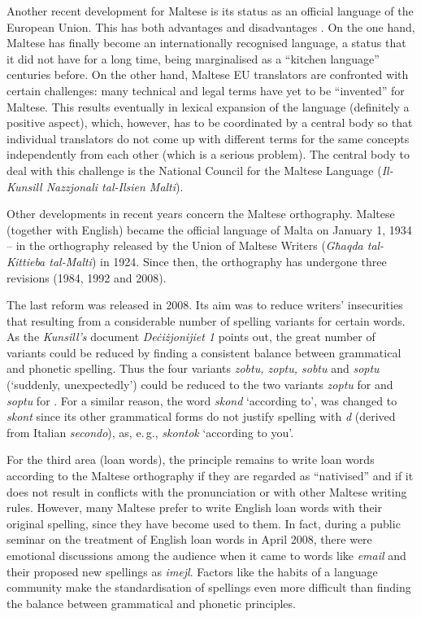 \documentclass[]{../../metanetpaper}
\begin{document}
\begin{multicols}{2}
Another recent development for Maltese is its status as an official language of the European Union. This has both advantages and disadvantages \cite{Fabri:2011a}. On the one hand, Maltese has finally become an internationally recognised language, a status that it did not have for a long time, being marginalised as a ``kitchen language'' centuries before. On the other hand, Maltese EU translators are confronted with certain challenges: many technical and legal terms have yet to be ``invented'' for Maltese. This results eventually in lexical expansion of the language (definitely a positive aspect), which, however, has to be coordinated by a central body so that individual translators do not come up with different terms for the same concepts independently from each other (which is a serious problem). The central body to deal with this challenge is the National Council for the Maltese Language (\emph{Il-Kunsill Nazzjonali tal-Ilsien Malti}).

Other developments in recent years concern the Maltese orthography. Maltese (together with English) became the official language of Malta on January 1, 1934 – in the orthography released by the Union of Maltese Writers (\emph{Għaqda tal-Kittieba tal-Malti}) in 1924. Since then, the orthography has undergone three revisions (1984, 1992 and 2008).

The last reform was released in 2008. Its aim was to reduce writers' insecurities that resulting from a considerable number of spelling variants for certain words. As the \emph{Kunsill’s} document \emph{Deċiżjonijiet 1} \cite{Kunsill:2008a} points out, the great number of variants could be reduced by finding a consistent balance between grammatical and phonetic spelling. Thus the four variants \emph{zobtu, zoptu, sobtu} and \emph{soptu} (`suddenly, unexpectedly') could be reduced to the two variants \emph{zoptu} for  and \emph{soptu} for . For a similar reason, the word \emph{skond}  `according to', was changed to \emph{skont} since its other grammatical forms do not justify spelling with \emph{d} (derived from Italian \emph{secondo}), as, e.\,g., \emph{skontok}  `according to you'.

For the third area (loan words), the principle remains to write loan words according to the Maltese orthography if they are regarded as ``nativised'' and if it does not result in conflicts with the pronunciation or with other Maltese writing rules. However, many Maltese prefer to write English loan words with their original spelling, since they have become used to them. In fact, during a public seminar on the treatment of English loan words in April 2008, there were emotional discussions among the audience when it came to words like \emph{email} and their proposed new spellings as \emph{imejl}. Factors like the habits of a language community make the standardisation of spellings even more difficult than finding the balance between grammatical and phonetic principles. 


\end{multicols}
\end{document}
